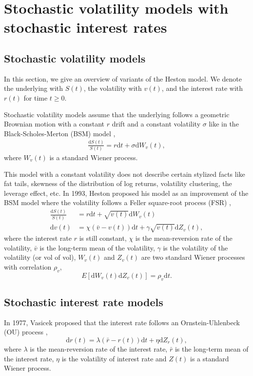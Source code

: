 \documentclass[12pt]{report}
\begin{document}
\section{Stochastic volatility models with stochastic interest rates}
\subsection{Stochastic volatility models}
In this section, we give an overview of variants of the Heston model. We denote the underlying with $S(t)$, the volatility with $v(t)$, and the interest rate with $r(t)$ for time $t \geq 0$.

Stochastic volatility models assume that the underlying follows a geometric Brownian motion with a constant $r$ drift and a constant volatility $\sigma$ like in the  Black-Scholes-Merton (BSM) model \cite{merton1973theory,Black1973pricing}, 
\begin{align}
    \frac{\mathrm{d} S(t)}{S(t)} = r\mathrm{d} t + \sigma \mathrm{d} W_v(t),
\end{align}
where $W_v(t)$ is a standard Wiener process. 

This model with a constant volatility does not describe certain stylized facts like fat tails, skewness of the distribution of log returns, volatility clustering, the leverage effect, etc. In 1993, Heston \cite{heston1993closed} proposed his model as an improvement of the BSM model where the volatility follows a Feller square-root process (FSR) \cite{feller1951two},
\begin{align}
    \frac{\mathrm{d} S(t)}{S(t)} &= r\mathrm{d} t + \sqrt{v(t)} \mathrm{d} W_v(t)\\
    \mathrm{d} v(t) &= \chi(\bar{v}-v(t)) \mathrm{d} t+\gamma \sqrt{v(t)} \mathrm{d} Z_v(t),
\end{align}
where the interest rate $r$ is still constant, $\chi$ is the mean-reversion rate of the volatility, $\bar{v}$ is the long-term mean of the volatility, $\gamma$ is the volatility of the volatility (or vol of vol), $W_v(t)$ and $Z_v(t)$ are two standard Wiener processes with correlation $\rho_v$, 
\begin{equation}
E\left[\mathrm{d} W_v(t) \mathrm{d} Z_v(t)\right]=\rho_v \mathrm{d} t.
\end{equation}

\subsection{Stochastic interest rate models}
In 1977, Vasicek \cite{vasicek1977equilibrium} proposed that the interest rate follows an Ornstein-Uhlenbeck (OU) process \cite{uhlenbeck1930theory},
\begin{equation}
    \mathrm{d} r(t) = \lambda\left(\bar{r}-r(t)\right) \mathrm{d} t+\eta \mathrm{d} Z_r(t),
\end{equation}
where $\lambda$ is the mean-reversion rate of the interest rate, $\bar{r}$ is the long-term mean of the interest rate, $\eta$ is the volatility of interest rate and $Z(t)$ is a standard Wiener process.
\end{document}
